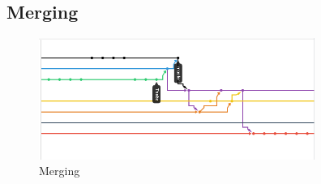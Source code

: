 \documentclass[english]{article}
\begin{document}
\subsection{Merging}

\begin{figure}[ht!]
\centering
\includegraphics[width=90mm]{images/merging.png}
\caption{Merging }
\end{figure}	

		
\end{document}

